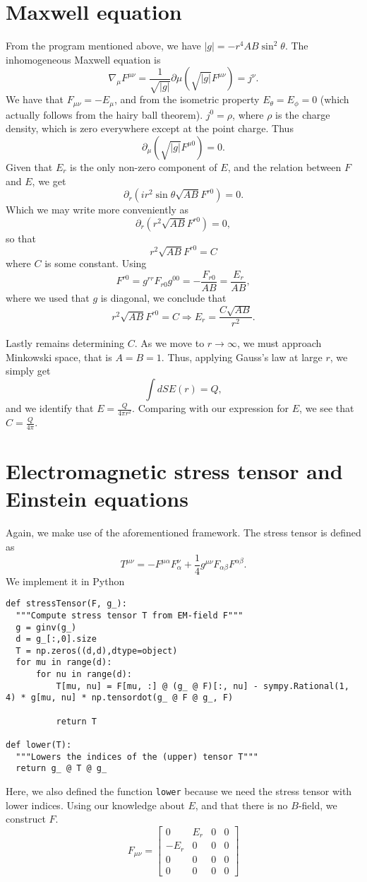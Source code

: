\documentclass{article}
\begin{document}
\section{Maxwell equation}
From the program mentioned above, we have $|g| = -r^4 A B \sin^2\theta$.
The inhomogeneous Maxwell equation is
$$
\nabla_\mu F^{\mu \nu} = \frac{1}{\sqrt{|g|}} \partial\mu \left(\sqrt{|g|} F^{\mu \nu} \right) = j^\nu.
$$
We have that $F_{\mu \nu} = -E_\mu$, and from the isometric property $E_\theta = E_\phi = 0$ (which actually follows from the hairy ball theorem).
$j^0 = \rho$, where $\rho$ is the charge density, which is zero everywhere except at the point charge.
Thus
$$
\partial_\mu \left( \sqrt{|g|} F^{\mu 0} \right) = 0.
$$
Given that $E_r$ is the only non-zero component of $E$, and the relation between $F$ and $E$, we get
$$
\partial_r \left( i r^2 \sin\theta \sqrt{A B} F^{r 0} \right) = 0.
$$
Which we may write more conveniently as
$$
\partial_r \left(r^2 \sqrt{A B} F^{r 0} \right) = 0,
$$
so that
$$
r^2 \sqrt{A B} F^{r 0} = C
$$
where $C$ is some constant.
Using
$$
F^{r 0} = g^{rr} F_{r 0} g^{00} = -\frac{F_{r 0}}{AB} = \frac{E_r}{AB},
$$
where we used that $g$ is diagonal, we conclude that
$$
r^2 \sqrt{A B} F^{r 0} = C \Rightarrow E_r = \frac{C \sqrt{AB}}{r^2}.
$$

Lastly remains determining $C$.
As we move to $r \rightarrow \infty$, we must approach Minkowski space, that is $A = B = 1$.
Thus, applying Gauss's law at large $r$, we simply get
$$
\int dS E(r) = Q,
$$
and we identify that $E = \frac{Q}{4\pi r^2}$.
Comparing with our expression for $E$, we see that $C = \frac{Q}{4\pi}$.

\section{Electromagnetic stress tensor and Einstein equations}
Again, we make use of the aforementioned framework.
The stress tensor is defined as
$$
T^{\mu \nu} = -F^{\mu \alpha} F^{\nu}_{\alpha} + \frac14 g^{\mu \nu} F_{\alpha \beta}F^{\alpha \beta}.
$$
We implement it in Python
\begin{lstlisting}
def stressTensor(F, g_):
  """Compute stress tensor T from EM-field F"""
  g = ginv(g_)
  d = g_[:,0].size
  T = np.zeros((d,d),dtype=object)
  for mu in range(d):
      for nu in range(d):
          T[mu, nu] = F[mu, :] @ (g_ @ F)[:, nu] - sympy.Rational(1, 4) * g[mu, nu] * np.tensordot(g_ @ F @ g_, F)
  
          return T

def lower(T):
  """Lowers the indices of the (upper) tensor T"""
  return g_ @ T @ g_
\end{lstlisting}
Here, we also defined the function \lstinline{lower} because we need the stress tensor with lower indices.
Using our knowledge about $E$, and that there is no $B$-field, we construct $F$.
$$
F_{\mu \nu} =
\begin{bmatrix}
  0 & E_r & 0 & 0\\
  -E_r & 0 & 0 & 0\\
  0 & 0 & 0 & 0\\
  0 & 0 & 0 & 0
\end{bmatrix}
$$
\end{document}

